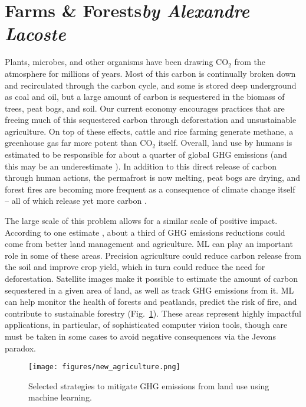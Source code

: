 \documentclass[11pt]{report}
\newcommand{\cd}{CO$_2$\xspace}
\begin{document}
\section{Farms \& Forests\texorpdfstring{\hfill\textit{by Alexandre Lacoste}}{}} \label{sec:afolu}
Plants, microbes, and other organisms have been drawing \cd from the atmosphere for millions of years. Most of this carbon is continually broken down and recirculated through the carbon cycle, and some is stored deep underground as coal and oil, but a large amount of carbon is sequestered in the biomass of trees, peat bogs, and soil. Our current economy encourages practices that are freeing much of this sequestered carbon through deforestation and unsustainable agriculture. On top of these effects, cattle and rice farming generate methane, a greenhouse gas far more potent than \cd itself. Overall, land use by humans is estimated to be responsible for about a quarter of global GHG emissions \cite{ipcc2014summary} (and this may be an underestimate \cite{mahowald2017impacts}). In addition to this direct release of carbon through human actions, the permafrost is now melting, peat bogs are drying, and forest fires are becoming more frequent as a consequence of climate change itself -- all of which release yet more carbon \cite{Climate_change_feedback}.

The large scale of this problem allows for a similar scale of positive impact. According to one estimate \cite{hawken2017drawdown}, about a third of GHG emissions reductions could come from better land management and agriculture. ML can play an important role in some of these areas. Precision agriculture could reduce carbon release from the soil and improve crop yield, which in turn could reduce the need for deforestation. Satellite images make it possible to estimate the amount of carbon sequestered in a given area of land, as well as track GHG emissions from it. ML can help monitor the health of forests and peatlands, predict the risk of fire, and contribute to sustainable forestry (Fig.~\ref{fig:agriculture}). These areas represent highly impactful applications, in particular, of sophisticated computer vision tools, though care must be taken in some cases to avoid negative consequences via the Jevons paradox.

\begin{figure}[hbpt]
    \centering
    \texttt{[image: figures/new\_agriculture.png]}
    \caption{Selected strategies to mitigate GHG emissions from land use using machine learning.}
    \label{fig:agriculture}
\end{figure}
\end{document}
